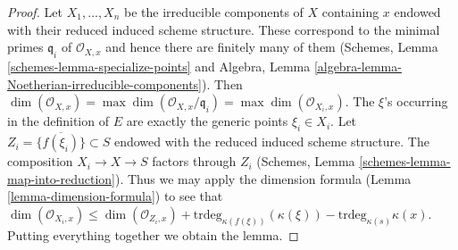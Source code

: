 \documentclass[10pt,a4paper]{amsart}
\theoremstyle{plain}
\theoremstyle{definition}
\theoremstyle{remark}
\numberwithin{equation}{subsection}
\begin{document}
\begin{proof}
Let $X_1, \ldots, X_n$ be the irreducible components of $X$ containing $x$
endowed with their reduced induced scheme structure.
These correspond to the minimal primes $\mathfrak q_i$ of
$\mathcal{O}_{X, x}$ and hence there are finitely many of them
(Schemes, Lemma \ref{schemes-lemma-specialize-points} and
Algebra, Lemma \ref{algebra-lemma-Noetherian-irreducible-components}).
Then
$\dim(\mathcal{O}_{X, x}) = \max \dim(\mathcal{O}_{X, x}/\mathfrak q_i)
= \max \dim(\mathcal{O}_{X_i, x})$.
The $\xi$'s occurring in the definition of $E$ are exactly the
generic points $\xi_i \in X_i$. Let $Z_i = \overline{\{f(\xi_i)\}} \subset S$
endowed with the reduced induced scheme structure.
The composition $X_i \to X \to S$ factors through $Z_i$
(Schemes, Lemma \ref{schemes-lemma-map-into-reduction}). Thus we may apply
the dimension formula (Lemma \ref{lemma-dimension-formula})
to see that
$\dim(\mathcal{O}_{X_i, x}) \leq \dim(\mathcal{O}_{Z_i, x}) +
\text{trdeg}_{\kappa(f(\xi))}(\kappa(\xi)) -
\text{trdeg}_{\kappa(s)} \kappa(x)$. Putting everything together
we obtain the lemma.
\end{proof}
\end{document}

